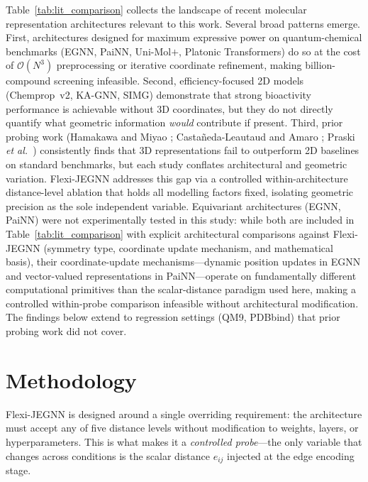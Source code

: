 \documentclass[pdflatex,sn-vancouver-num]{sn-jnl}%
\theoremstyle{thmstyleone}%
\theoremstyle{thmstyletwo}%
\theoremstyle{thmstylethree}%
\begin{document}
Table~\ref{tab:lit_comparison} collects the landscape of recent molecular representation architectures relevant to this work.  Several broad patterns emerge.  First, architectures designed for maximum expressive power on quantum-chemical benchmarks (EGNN, PaiNN, Uni-Mol$+$, Platonic Transformers) do so at the cost of $\mathcal{O}(N^3)$ preprocessing or iterative coordinate refinement, making billion-compound screening infeasible.  Second, efficiency-focused 2D models (Chemprop~v2, KA-GNN, SIMG) demonstrate that strong bioactivity performance is achievable without 3D coordinates, but they do not directly quantify what geometric information \emph{would} contribute if present.  Third, prior probing work (Hamakawa and Miyao \cite{hamakawa2025conformation}; Castañeda-Leautaud and Amaro \cite{Castaneda_Leautaud_2025}; Praski \emph{et al.}\ \cite{praski2025benchmarking}) consistently finds that 3D representations fail to outperform 2D baselines on standard benchmarks, but each study conflates architectural and geometric variation.  Flexi-JEGNN addresses this gap via a controlled within-architecture distance-level ablation that holds all modelling factors fixed, isolating geometric precision as the sole independent variable.  Equivariant architectures (EGNN, PaiNN) were not experimentally tested in this study: while both are included in Table~\ref{tab:lit_comparison} with explicit architectural comparisons against Flexi-JEGNN (symmetry type, coordinate update mechanism, and mathematical basis), their coordinate-update mechanisms---dynamic position updates in EGNN and vector-valued representations in PaiNN---operate on fundamentally different computational primitives than the scalar-distance paradigm used here, making a controlled within-probe comparison infeasible without architectural modification.  The findings below extend to regression settings (QM9, PDBbind) that prior probing work did not cover. \\

\section{Methodology}
\label{sec:methods}


Flexi-JEGNN is designed around a single overriding requirement: the
architecture must accept any of five distance levels without modification to
weights, layers, or hyperparameters.  This is what makes it a
\emph{controlled probe}---the only variable that changes across conditions is
the scalar distance $e_{ij}$ injected at the edge encoding stage.
\end{document}

